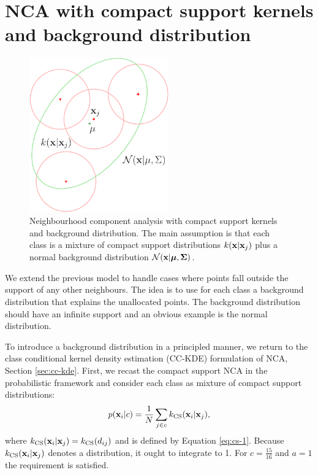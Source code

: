 	
\section{NCA with compact support kernels and background distribution}
\label{sec:nca-cs-back}

	\begin{figure}
	  \centering\includegraphics[width=6cm]{images/nca-cs-back}
	  \caption{Neighbourhood component analysis with compact support kernels and
	background distribution. The main assumption is that each class is a mixture of
	compact support distributions $k(\mathbf{x}|\mathbf{x}_j)$ plus a normal background
	distribution $\mathcal{N}(\mathbf{x}|\mbox{\boldmath $\mu$},\mbox{\boldmath $\Sigma$})$.}
	  \label{fig:cs-back}
	\end{figure}
	
	We extend the previous model to handle cases where points fall outside the support of any other neighbours. The idea is to use  for each class a background distribution that explains the unallocated points. The background distribution should have an infinite support and an obvious example is the normal distribution.
	
	To introduce a background distribution in a principled manner, we return to the class conditional kernel density estimation (CC-KDE) formulation of NCA, Section \ref{sec:cc-kde}. First, we recast the compact support NCA in the probabilistic framework and consider each class as mixture of compact support distributions: 
	\begin{align}
		p(\mathbf{x}_i|c) = \frac{1}{N}\sum_{j\in c} k_\text{CS}(\mathbf{x}_i|\mathbf{x}_j),
	\end{align}
	where $k_\text{CS}(\mathbf{x}_i|\mathbf{x}_j) = k_\text{CS}(d_{ij})$ and is defined by Equation \ref{eq:cs-1}. Because $k_\text{CS}(\mathbf{x}_i|\mathbf{x}_j)$ denotes a distribution, it ought to integrate to 1. For $c=\frac{15}{16}$ and $a=1$ the requirement is satisfied.
	
